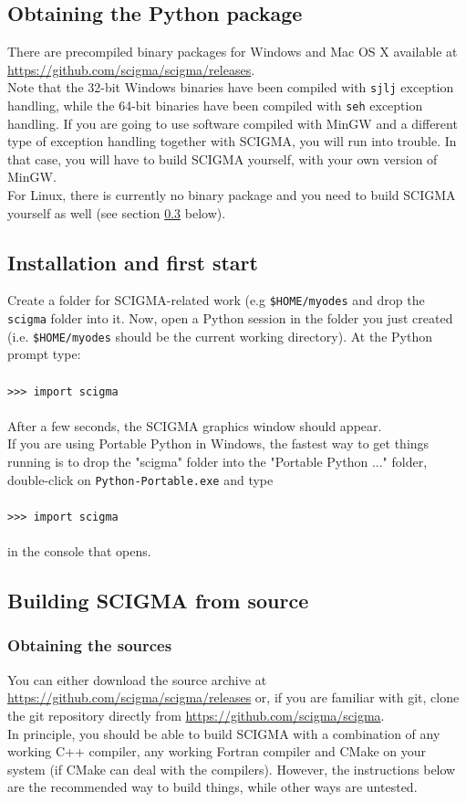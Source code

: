 \documentclass[10pt,a4paper,titlepage]{article}
\newcommand{\T}[1]{\texttt{#1}}
\newcommand{\C}[1]{\\\\\T{#1}\\\\}
\begin{document}
\subsection{Obtaining the Python package}
 There are precompiled binary packages for Windows and Mac OS X available at \url{https://github.com/scigma/scigma/releases}.\\ 
 Note that the 32-bit Windows binaries have been compiled with \T{sjlj} exception handling, while the 64-bit binaries have been compiled with
\T{seh} exception handling. If you are going to use software compiled with MinGW and a different type of exception handling together with SCIGMA, you will run into trouble. In that case, you will have to build SCIGMA yourself, with your own version of MinGW.\\
For Linux, there is currently no binary package and you need to build SCIGMA yourself as well (see section \ref{sec::building} below).
\subsection{Installation and first start}
\label{sec::running}
Create a folder for SCIGMA-related work (e.g \T{\$HOME/myodes} and drop the \T{scigma} folder into it. Now, open a Python session in the folder you just created (i.e. \T{\$HOME/myodes} should be the current working directory). At the Python prompt type:
\C{>>> import scigma}
After a few seconds, the SCIGMA graphics window should appear.\\
If you are using Portable Python in Windows, the fastest way to get things running is to drop the "scigma" folder into the "Portable Python ..." folder, double-click on \T{Python-Portable.exe} and type 
\C{>>> import scigma}
in the console that opens.
\subsection{Building SCIGMA from source}
\label{sec::building}
\subsubsection{Obtaining the sources}
You can either download the source archive at \url{https://github.com/scigma/scigma/releases}
or, if you are familiar with git, clone the git repository directly from \url{https://github.com/scigma/scigma}.\\
In principle, you should be able to build SCIGMA with a combination of any  working C++ compiler, any working Fortran compiler and CMake on your system (if CMake can deal with the compilers). However, the instructions below are the recommended way to build things, while other ways are untested.
\end{document}
